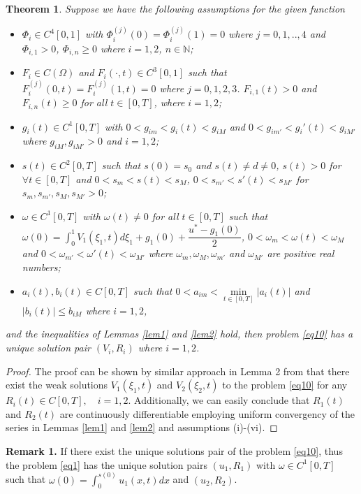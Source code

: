 \documentclass[preprint,12pt,authoryear]{elsarticle}
\newtheorem{theorem}{Theorem}
\begin{document}
\begin{theorem}\label{thm1}
    Suppose we have the following assumptions for the given function
    \begin{itemize}
        \item[(i)] $\Phi_i\in C^4[0,1]$ with $\Phi_i^{(j)}(0)=\Phi_i^{(j)}(1)=0$ where $j=0,1,..,4$ and $\Phi_{i,1}>0$, $\Phi_{i,n}\geq 0$ where $i=1,2$, $n\in\mathbb{N}$;
        \item[(ii)] $F_i\in C(\Omega)$ and $F_{i}(\cdot,t)\in C^3[0,1]$ such that $F_i^{(j)}(0,t)=F_i^{(j)}(1,t)=0$ where $j=0,1,2,3$. $F_{i,1}(t)>0$ and $F_{i,n}(t)\geq 0$ for all $t\in[0,T]$, where $i=1,2$;
        \item[(iii)] $g_i(t)\in C^1[0,T]$ with $0<g_{im}<g_i(t)<g_{iM}$ and $0<g_{im'}<g_i'(t)<g_{iM'}$ where $g_{iM},g_{iM'}>0$ and $i=1,2$;
        \item[(iv)] $s(t)\in C^2[0,T]$ such that $s(0)=s_0$ and $s(t)\neq d\neq 0$, $s(t)>0$ for $\forall t\in [0,T]$ and $0<s_m<s(t)<s_M$, $0<s_{m'}<s'(t)<s_{M'}$ for $s_m,s_{m'},s_M,s_{M'}>0$;
        \item[(v)] $\omega\in C^1[0,T]$ with $\omega(t)\neq 0$ for all $t\in[0,T]$ such that $\omega(0)=\int_0^1V_1(\xi_1,t)d\xi_1+g_1(0)+\dfrac{u^*-g_1(0)}{2}$,  $0<\omega_{m}<\omega(t)<\omega_{M}$ and $0<\omega_{m'}<\omega'(t)<\omega_{M'}$ where $\omega_m,\omega_{M},\omega_{m'}$ and $\omega_{M'}$ are positive real numbers;
        \item[(vi)] $a_i(t),b_i(t)\in C[0,T]$ such that $0<a_{im}<\min\limits_{t\in[0,T]}|a_i(t)|$ and $|b_i(t)|\leq b_{iM}$ where $i=1,2$, 
    \end{itemize}
    and the inequalities of Lemmas \ref{lem1} and \ref{lem2} hold, then problem \eqref{eq10} has a unique solution pair $(V_i,R_i)$ where $i=1,2$.
\end{theorem}
\begin{proof}
    The proof can be shown by similar approach in Lemma 2 from \cite{20} that there exist the weak solutions $V_1(\xi_1,t)$ and $V_2(\xi_2,t)$ to the problem \eqref{eq10} for any $R_i(t)\in C[0,T],\quad i=1,2$. Additionally, we can easily conclude that $R_1(t)$ and $R_2(t)$ are continuously differentiable employing uniform convergency of the series in Lemmas \ref{lem1} and \ref{lem2} and assumptions (i)-(vi).    
\end{proof}
\textbf{Remark 1.} If there exist the unique solutions pair of the problem \eqref{eq10}, thus the problem \eqref{eq1} has the unique solution pairs $(u_1,R_1)$ with $\omega\in C^1[0,T]$ such that $\omega(0)=\int_0^{s(0)}u_1(x,t)dx$ and $(u_2,R_2)$.
\end{document}
